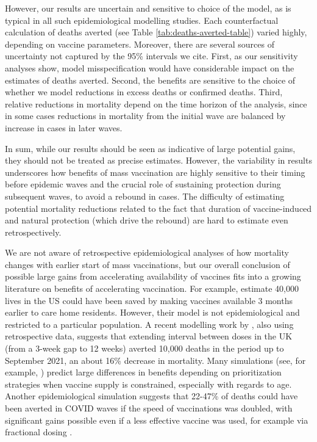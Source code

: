 \documentclass{article}
\begin{document}
However, our results are uncertain and sensitive to choice of the model, as is typical in all such epidemiological modelling studies. Each counterfactual calculation of deaths averted (see Table \ref{tab:deaths-averted-table}) varied highly, depending on vaccine parameters. Moreover, there are several sources of uncertainty not captured by the 95\% intervals we cite. First, as our sensitivity analyses show, model misspecification would have considerable impact on the estimates of deaths averted. Second, the benefits are sensitive to the choice of whether we model reductions in excess deaths or confirmed deaths. Third, relative reductions in mortality depend on the time horizon of the analysis, since in some cases reductions in mortality from the initial wave are balanced by increase in cases in later waves.

In sum, while our results should be seen as indicative of large potential gains, they should not be treated as precise estimates. However, the variability in results underscores how benefits of mass vaccination are highly sensitive to their timing before epidemic waves and the crucial role of sustaining protection during subsequent waves, to avoid a rebound in cases. The difficulty of estimating potential mortality reductions related to the fact that duration of vaccine-induced and natural protection (which drive the rebound) are hard to estimate even retrospectively.

We are not aware of retrospective epidemiological analyses of how mortality changes with earlier start of mass vaccinations, but our overall conclusion of possible large gains from accelerating availability of vaccines fits into a growing literature on benefits of accelerating vaccination. For example, \citet{Bjoerkheim2022COVID} estimate 40,000 lives in the US could have been saved by making vaccines available 3 months earlier to care home residents. However, their model is not epidemiological and restricted to a particular population. A recent modelling work by \citet{Imai2023Quantifying}, also using retrospective data, suggests that extending interval between doses in the UK (from a 3-week gap to 12 weeks) averted 10,000 deaths in the period up to September 2021, an about 16\% decrease in mortality. Many simulations (see, for example, \citet{Bubar2021Model}) predict large differences in benefits depending on prioritization strategies when vaccine supply is constrained, especially with regards to age. Another epidemiological simulation suggests that 22-47\% of deaths could have been averted in COVID waves if the speed of vaccinations was doubled, with significant gains possible even if a less effective vaccine was used, for example via fractional dosing \citep{Wiecek2022Testing}.
\end{document}
